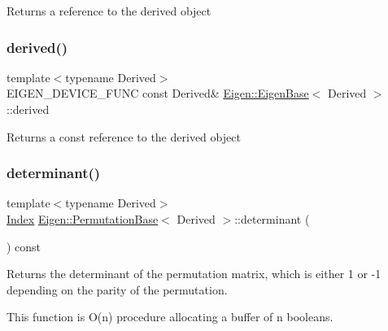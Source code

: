 \begin{DoxyReturn}{Returns}
a reference to the derived object 
\end{DoxyReturn}
\mbox{\label{class_eigen_1_1_permutation_base_ad0cbee5e2dfef3bbe9db5e6d5fe12cc0}} 
\subsubsection{\texorpdfstring{derived()}{derived()}\hspace{0.1cm}{\footnotesize\ttfamily [2/2]}}
{\footnotesize\ttfamily template$<$typename Derived$>$ \\
E\+I\+G\+E\+N\+\_\+\+D\+E\+V\+I\+C\+E\+\_\+\+F\+U\+NC const Derived\& \mbox{\hyperlink{struct_eigen_1_1_eigen_base}{Eigen\+::\+Eigen\+Base}}$<$ Derived $>$\+::derived\hspace{0.3cm}{\ttfamily [inline]}}

\begin{DoxyReturn}{Returns}
a const reference to the derived object 
\end{DoxyReturn}
\mbox{\label{class_eigen_1_1_permutation_base_a1fc7a5823544700c2e0795e87f9c6d09}} 
\subsubsection{\texorpdfstring{determinant()}{determinant()}}
{\footnotesize\ttfamily template$<$typename Derived$>$ \\
\mbox{\hyperlink{struct_eigen_1_1_eigen_base_a554f30542cc2316add4b1ea0a492ff02}{Index}} \mbox{\hyperlink{class_eigen_1_1_permutation_base}{Eigen\+::\+Permutation\+Base}}$<$ Derived $>$\+::determinant (\begin{DoxyParamCaption}{ }\end{DoxyParamCaption}) const\hspace{0.3cm}{\ttfamily [inline]}}

\begin{DoxyReturn}{Returns}
the determinant of the permutation matrix, which is either 1 or -\/1 depending on the parity of the permutation.
\end{DoxyReturn}
This function is O({\ttfamily n}) procedure allocating a buffer of {\ttfamily n} booleans. \mbox{\label{class_eigen_1_1_permutation_base_adec727546b6882ecaa57e76d084951c5}} 
